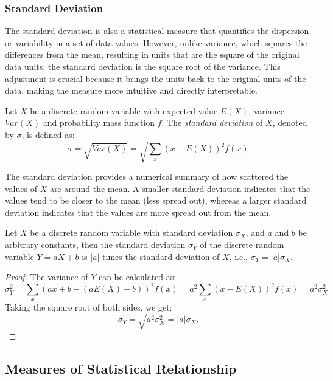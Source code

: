 
\subsubsection*{Standard Deviation}

The standard deviation is also a statistical measure that quantifies the dispersion or variability in a set of data values. However, unlike variance, which squares the differences from the mean, resulting in units that are the square of the original data units, the standard deviation is the square root of the variance. This adjustment is crucial because it brings the units back to the original units of the data, making the measure more intuitive and directly interpretable.

\begin{definition}
Let $X$ be a discrete random variable with expected value $E(X)$,  variance $Var(X)$ and probability mass function $f$. The \emph{standard deviation} of $X$, denoted by $\sigma$, is defined as:
\[
\sigma = \sqrt{Var(X)} = \sqrt{\sum_{x} (x - E(X))^2 f(x)}
\]
\end{definition}

The standard deviation provides a numerical summary of how scattered the values of $X$ are around the mean. A smaller standard deviation indicates that the values tend to be closer to the mean (less spread out), whereas a larger standard deviation indicates that the values are more spread out from the mean.

\begin{proposition}
Let $X$ be a discrete random variable with standard deviation $\sigma_X$, and $a$ and $b$ be arbitrary constants, then the standard deviation $\sigma_Y$ of the discrete random variable $Y = aX + b$ is $|a|$ times the standard deviation of $X$, i.e., $\sigma_Y = |a| \sigma_X$.
\end{proposition}
\begin{proof}
The variance of $Y$ can be calculated as:
\[
\sigma_Y^2 = \sum_{x} (a x + b - (a E(X) + b))^2 f(x) = a^2 \sum_{x} (x - E(X))^2 f(x) = a^2 \sigma_X^2
\]
Taking the square root of both sides, we get:
\[
\sigma_Y = \sqrt{a^2 \sigma_X^2} = |a| \sigma_X.
\]
\end{proof}

%
%

\subsection{Measures of Statistical Relationship}

